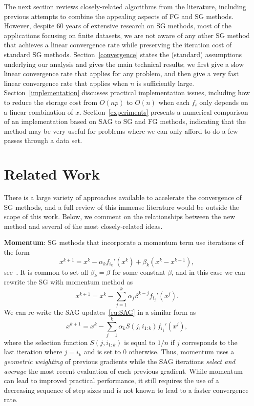 \documentclass{article}
\begin{document}
The next section reviews closely-related algorithms from the
literature, including previous attempts to combine the appealing aspects of
FG and SG methods.  However,  {despite $60$ years of extensive research on SG methods, most of the applications focusing on finite datasets,
we are not aware of any other SG
method that achieves a linear convergence rate while preserving the
iteration cost of standard SG methods}.  Section~\ref{convergence} states the
(standard) assumptions underlying our analysis and gives the main technical
results; we first give a slow linear convergence rate that applies for any problem, and then give 
a very fast linear convergence rate that applies when $n$ is sufficiently large.
Section~\ref{implementation} discusses practical
implementation issues, including how to reduce the storage cost from
$O(np)$ to $O(n)$ when each $f_i$ only depends on a linear combination of $x$.
 Section~\ref{experiments} presents a numerical
comparison of an implementation based on SAG to SG and FG methods, indicating that the method
may be very useful for problems where we can 
 only afford to do a few passes through
a data set.


\section{Related Work}
\label{related}


There is a large variety of approaches available to accelerate the
convergence of SG methods, and a full review of this immense literature
would be outside the scope of this work.  Below, we comment on the
relationships between the new method and several of the most closely-related
ideas.

\textbf{Momentum}: SG methods that incorporate a momentum term use
iterations of the form
\[
x^{k+1} = x^k - \alpha_k f_{i_k}'(x^k) + \beta_k(x^k - x^{k-1}),
\]
see~\cite{tseng1998incremental}.
It is common to set all $\beta_k = \beta$ for some constant $\beta$, and in
this case we can rewrite the SG with momentum method as
\[
\textstyle
x^{k+1} = x^k - \sum_{j=1}^k\alpha_j\beta^{k-j}f_{i_j}'(x^j).
\]
We can re-write the SAG updates~\eqref{eq:SAG} in a similar form as
\begin{equation}
\label{eq:SAG2}
\textstyle
x^{k+1} = x^k - \sum_{j=1}^k\alpha_kS(j,i_{1:k})f_{i_j}'(x^j),
\end{equation}
where the selection function $S(j,i_{1:k})$ is equal to $1/n$ if $j$ corresponds to the
last iteration where $j=i_k$
and is set to $0$ otherwise.
Thus, momentum uses a \emph{geometric weighting} of previous gradients while
the SAG iterations \emph{select and average} the most recent evaluation of each previous
gradient.  While momentum can lead to improved practical performance, it
still requires the use of a decreasing sequence of step sizes and is not
known to lead to a faster convergence rate.
\end{document}
